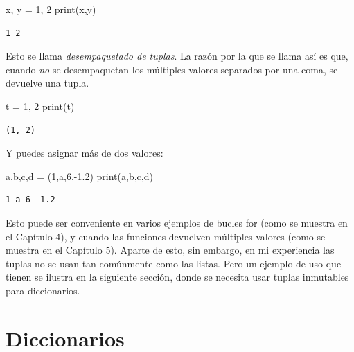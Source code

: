 \documentclass[
  letterpaper,
]{scrbook}
\newenvironment{Shaded}{\begin{snugshade}}{\end{snugshade}}
\newcommand{\BuiltInTok}[1]{\textcolor[rgb]{0.00,0.23,0.31}{#1}}
\newcommand{\DecValTok}[1]{\textcolor[rgb]{0.68,0.00,0.00}{#1}}
\newcommand{\FloatTok}[1]{\textcolor[rgb]{0.68,0.00,0.00}{#1}}
\newcommand{\NormalTok}[1]{\textcolor[rgb]{0.00,0.23,0.31}{#1}}
\newcommand{\OperatorTok}[1]{\textcolor[rgb]{0.37,0.37,0.37}{#1}}
\newcommand{\StringTok}[1]{\textcolor[rgb]{0.13,0.47,0.30}{#1}}
\begin{document}
\begin{Shaded}
\begin{Highlighting}[]
\NormalTok{x, y }\OperatorTok{=} \DecValTok{1}\NormalTok{, }\DecValTok{2}
\BuiltInTok{print}\NormalTok{(x,y)}
\end{Highlighting}
\end{Shaded}

\begin{verbatim}
1 2
\end{verbatim}

Esto se llama \emph{desempaquetado de tuplas}. La razón por la que se
llama así es que, cuando \emph{no} se desempaquetan los múltiples
valores separados por una coma, se devuelve una tupla.

\begin{Shaded}
\begin{Highlighting}[]
\NormalTok{t }\OperatorTok{=} \DecValTok{1}\NormalTok{, }\DecValTok{2}
\BuiltInTok{print}\NormalTok{(t)}
\end{Highlighting}
\end{Shaded}

\begin{verbatim}
(1, 2)
\end{verbatim}

Y puedes asignar más de dos valores:

\begin{Shaded}
\begin{Highlighting}[]
\NormalTok{a,b,c,d }\OperatorTok{=}\NormalTok{ (}\DecValTok{1}\NormalTok{,}\StringTok{\textquotesingle{}a\textquotesingle{}}\NormalTok{,}\DecValTok{6}\NormalTok{,}\OperatorTok{{-}}\FloatTok{1.2}\NormalTok{)}
\BuiltInTok{print}\NormalTok{(a,b,c,d)}
\end{Highlighting}
\end{Shaded}

\begin{verbatim}
1 a 6 -1.2
\end{verbatim}

Esto puede ser conveniente en varios ejemplos de bucles for (como se
muestra en el Capítulo 4), y cuando las funciones devuelven múltiples
valores (como se muestra en el Capítulo 5). Aparte de esto, sin embargo,
en mi experiencia las tuplas no se usan tan comúnmente como las listas.
Pero un ejemplo de uso que tienen se ilustra en la siguiente sección,
donde se necesita usar tuplas inmutables para diccionarios.

\section{Diccionarios}\label{diccionarios}
\end{document}
